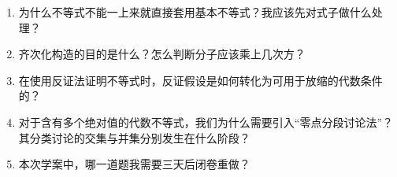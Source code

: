 \documentclass[12pt,a4paper]{ctexart}
\begin{document}
\begin{enumerate}[label=\arabic*. , leftmargin=2em, itemsep=1.5em]
  \item 为什么不等式不能一上来就直接套用基本不等式？我应该先对式子做什么处理？
  
  \vspace{0.8cm}
  
  \item 齐次化构造的目的是什么？怎么判断分子应该乘上几次方？
  
  \vspace{0.8cm}
  
  \item 在使用反证法证明不等式时，反证假设是如何转化为可用于放缩的代数条件的？
  
  \vspace{0.8cm}
  
  \item 对于含有多个绝对值的代数不等式，我们为什么需要引入“零点分段讨论法”？其分类讨论的交集与并集分别发生在什么阶段？
  
  \vspace{0.8cm}
  
  \item 本次学案中，哪一道题我需要三天后闭卷重做？
  
  \vspace{0.8cm}
\end{enumerate}
\end{document}
